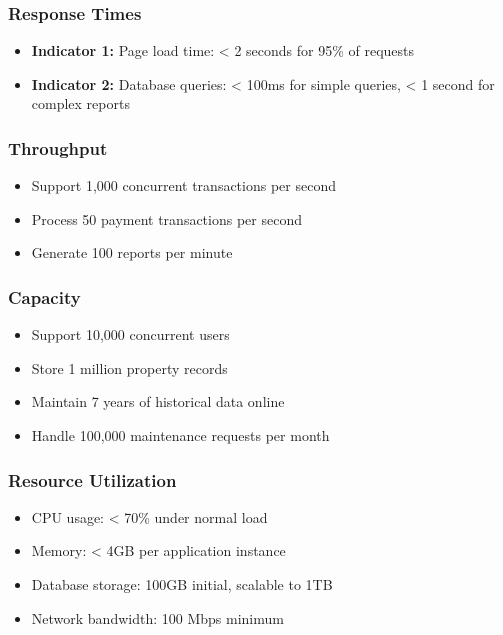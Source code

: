 \documentclass[12pt]{article}
\begin{document}
\subsubsection{Response Times}
\begin{itemize}
    \item \textbf{Indicator 1:} Page load time: < 2 seconds for 95\% of requests
    \item \textbf{Indicator 2:} Database queries: < 100ms for simple queries, < 1 second for complex reports
\end{itemize}

\subsubsection{Throughput}
\begin{itemize}
    \item Support 1,000 concurrent transactions per second
    \item Process 50 payment transactions per second
    \item Generate 100 reports per minute
\end{itemize}

\subsubsection{Capacity}
\begin{itemize}
    \item Support 10,000 concurrent users
    \item Store 1 million property records
    \item Maintain 7 years of historical data online
    \item Handle 100,000 maintenance requests per month
\end{itemize}

\subsubsection{Resource Utilization}
\begin{itemize}
    \item CPU usage: < 70\% under normal load
    \item Memory: < 4GB per application instance
    \item Database storage: 100GB initial, scalable to 1TB
    \item Network bandwidth: 100 Mbps minimum
\end{itemize}
\end{document}
